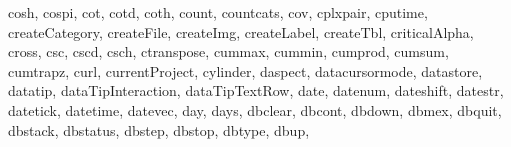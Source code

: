 {{        cosh,%
        cospi,%
        cot,%
        cotd,%
        coth,%
        count,%
        countcats,%
        cov,%
        cplxpair,%
        cputime,%
        createCategory,%
        createFile,%
        createImg,%
        createLabel,%
        createTbl,%
        criticalAlpha,%
        cross,%
        csc,%
        cscd,%
        csch,%
        ctranspose,%
        cummax,%
        cummin,%
        cumprod,%
        cumsum,%
        cumtrapz,%
        curl,%
        currentProject,%
        cylinder,%
        daspect,%
        datacursormode,%
        datastore,%
        datatip,%
        dataTipInteraction,%
        dataTipTextRow,%
        date,%
        datenum,%
        dateshift,%
        datestr,%
        datetick,%
        datetime,%
        datevec,%
        day,%
        days,%
        dbclear,%
        dbcont,%
        dbdown,%
        dbmex,%
        dbquit,%
        dbstack,%
        dbstatus,%
        dbstep,%
        dbstop,%
        dbtype,%
        dbup,%
}}
